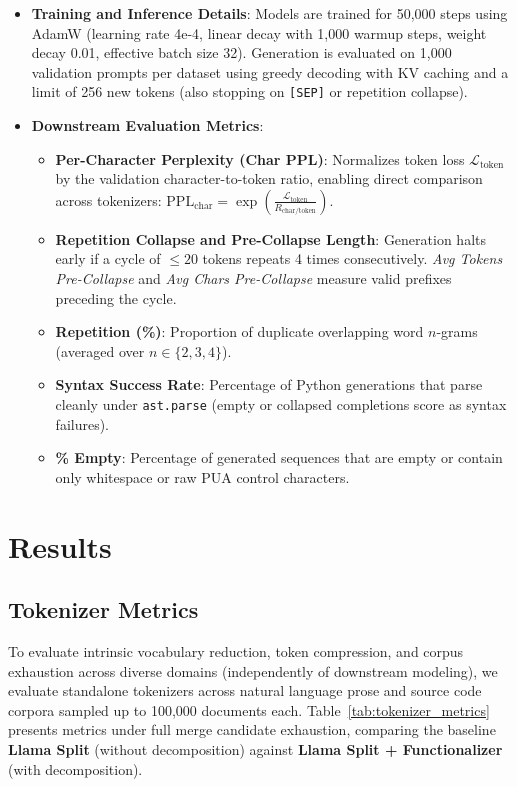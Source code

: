 \documentclass{article}
\begin{document}
\begin{itemize}
    \item \textbf{Training and Inference Details}: Models are trained for 50,000 steps using AdamW (learning rate 4e-4, linear decay with 1,000 warmup steps, weight decay 0.01, effective batch size 32). Generation is evaluated on 1,000 validation prompts per dataset using greedy decoding with KV caching and a limit of 256 new tokens (also stopping on \texttt{[SEP]} or repetition collapse).
    \item \textbf{Downstream Evaluation Metrics}:
    \begin{itemize}
        \item \textbf{Per-Character Perplexity (Char PPL)}: Normalizes token loss $\mathcal{L}_{\text{token}}$ by the validation character-to-token ratio, enabling direct comparison across tokenizers: $\text{PPL}_{\text{char}} = \exp\left(\frac{\mathcal{L}_{\text{token}}}{R_{\text{char/token}}}\right)$.
        \item \textbf{Repetition Collapse and Pre-Collapse Length}: Generation halts early if a cycle of $\le 20$ tokens repeats 4 times consecutively. \textit{Avg Tokens Pre-Collapse} and \textit{Avg Chars Pre-Collapse} measure valid prefixes preceding the cycle.
        \item \textbf{Repetition (\%)}: Proportion of duplicate overlapping word $n$-grams (averaged over $n \in \{2, 3, 4\}$).
        \item \textbf{Syntax Success Rate}: Percentage of Python generations that parse cleanly under \texttt{ast.parse} (empty or collapsed completions score as syntax failures).
        \item \textbf{\% Empty}: Percentage of generated sequences that are empty or contain only whitespace or raw PUA control characters.
    \end{itemize}
\end{itemize}

\section{Results}

\subsection{Tokenizer Metrics}\label{sec:results_tokenizer}

To evaluate intrinsic vocabulary reduction, token compression, and corpus exhaustion across diverse domains (independently of downstream modeling), we evaluate standalone tokenizers across natural language prose and source code corpora sampled up to 100,000 documents each. Table~\ref{tab:tokenizer_metrics} presents metrics under full merge candidate exhaustion, comparing the baseline \textbf{Llama Split} (without decomposition) against \textbf{Llama Split + Functionalizer} (with decomposition).
\end{document}
